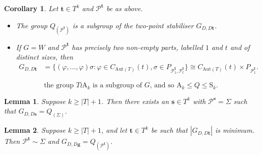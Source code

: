 \documentclass[10pt,a4paper]{amsart}
\newtheorem{lem}{Lemma}
\newtheorem{cor}{Corollary}
\newcommand{\An}{\mathrm{A}}
\newcommand{\Aut}{\mathrm{Aut}}
\newcommand{\Sn}{\mathrm{S}}
\newcommand{\geqs}{\geqslant}
\def\le{\leqs}
\newcommand{\leqs}{\leqslant}
\begin{document}
\begin{cor}
	\label{c:stab_2-parts}
	Let $\mathbf{t} \in T^k$ and $\mathcal{P}^{\mathbf{t}}$ be as above. 
    \begin{itemize}\addtolength{\itemsep}{0.2\baselineskip}
        \item[{\rm (i)}] The group $Q_{(\mathcal{P}^{\mathbf{t}})}$ is a subgroup of the two-point stabiliser $G_{D , D\mathbf{t}}$.
        \item[{\rm (ii)}] If $G = W$ and $\mathcal{P}^{\mathbf{t}}$ has precisely two non-empty parts, labelled $1$ and $t$ and of distinct sizes, then 
	\begin{equation*}
	\begin{aligned}
	G_{D, D\mathbf{t}} &= \{(\varphi,\dots,\varphi)\sigma: \varphi\in C_{\Aut(T)}(t), \sigma\in P_{\mathcal{P}_1^{\mathbf{t}}, \mathcal{P}_t^{\mathbf{t}}}\} \cong C_{\Aut(T)}(t)\times P_{\mathcal{P}_1^{\mathbf{t}}}.
	\end{aligned}
	\end{equation*}
    \end{itemize}
\end{cor}

\begin{equation}\label{eq:wreath}
    \mbox{the group $T \wr \An_k$ is a subgroup of $G$, and so $\An_k \le Q \le \Sn_k$.}
\end{equation}

\begin{lem}
	\label{l:two_stab_sigma}
	Suppose $k\geqs |T|+1$. Then there exists an $\mathbf{s}\in T^k$ with $\mathcal{P}^{\mathbf{s}} = \Sigma$ such that $G_{D,D\mathbf{s}} = Q_{(\Sigma)}$.
\end{lem}

\begin{lem}
	\label{l:greedy_two_stab}
	Suppose $k\geqs |T|+1$, and let $\mathbf{t}\in T^k$ be such that $|G_{D,D\mathbf{t}}|$ is minimum. Then $\mathcal{P}^{\mathbf{t}}\sim\Sigma$ and $G_{D,D\mathbf{g}} = Q_{(\mathcal{P}^{\mathbf{t}})}$. 
\end{lem}
\end{document}

